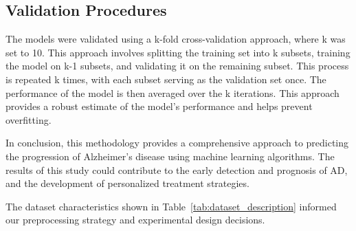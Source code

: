 \documentclass[conference]{IEEEtran}
\begin{document}
\subsection{Validation Procedures}

The models were validated using a k-fold cross-validation approach, where k was set to 10. This approach involves splitting the training set into k subsets, training the model on k-1 subsets, and validating it on the remaining subset. This process is repeated k times, with each subset serving as the validation set once. The performance of the model is then averaged over the k iterations. This approach provides a robust estimate of the model's performance and helps prevent overfitting. 

In conclusion, this methodology provides a comprehensive approach to predicting the progression of Alzheimer's disease using machine learning algorithms. The results of this study could contribute to the early detection and prognosis of AD, and the development of personalized treatment strategies.

The dataset characteristics shown in Table~\ref{tab:dataset_description} informed our preprocessing strategy and experimental design decisions.
\end{document}
